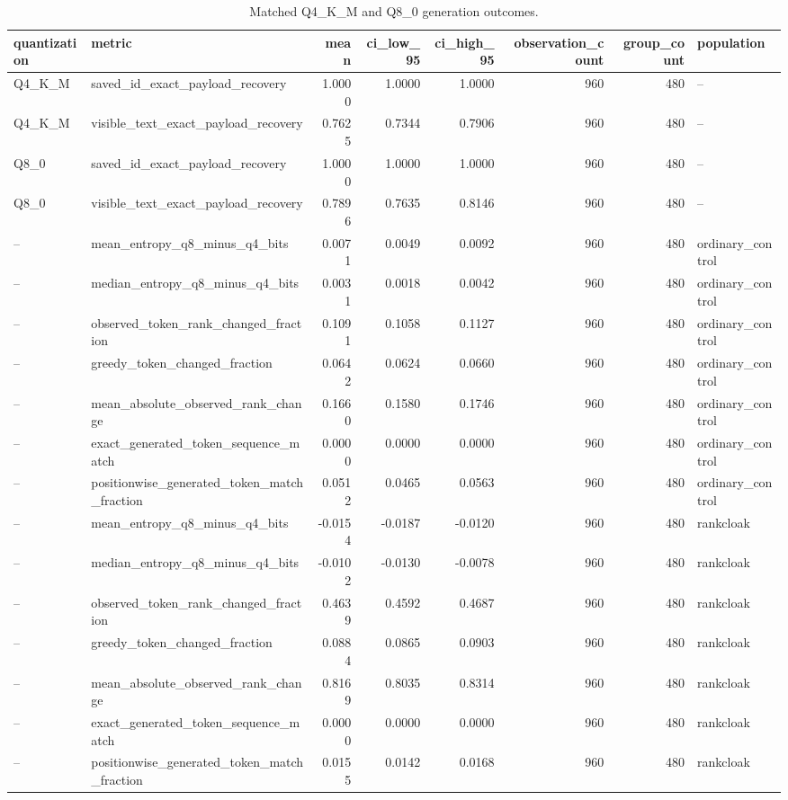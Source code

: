 \begin{table}
\caption{Matched Q4_K_M and Q8_0 generation outcomes.}
\label{tab:matched-quantization-generation}
\begin{tabular}{llrrrrrl}
\toprule
quantization & metric & mean & ci\_low\_95 & ci\_high\_95 & observation\_count & group\_count & population \\
\midrule
Q4\_K\_M & saved\_id\_exact\_payload\_recovery & 1.0000 & 1.0000 & 1.0000 & 960 & 480 & -- \\
Q4\_K\_M & visible\_text\_exact\_payload\_recovery & 0.7625 & 0.7344 & 0.7906 & 960 & 480 & -- \\
Q8\_0 & saved\_id\_exact\_payload\_recovery & 1.0000 & 1.0000 & 1.0000 & 960 & 480 & -- \\
Q8\_0 & visible\_text\_exact\_payload\_recovery & 0.7896 & 0.7635 & 0.8146 & 960 & 480 & -- \\
-- & mean\_entropy\_q8\_minus\_q4\_bits & 0.0071 & 0.0049 & 0.0092 & 960 & 480 & ordinary\_control \\
-- & median\_entropy\_q8\_minus\_q4\_bits & 0.0031 & 0.0018 & 0.0042 & 960 & 480 & ordinary\_control \\
-- & observed\_token\_rank\_changed\_fraction & 0.1091 & 0.1058 & 0.1127 & 960 & 480 & ordinary\_control \\
-- & greedy\_token\_changed\_fraction & 0.0642 & 0.0624 & 0.0660 & 960 & 480 & ordinary\_control \\
-- & mean\_absolute\_observed\_rank\_change & 0.1660 & 0.1580 & 0.1746 & 960 & 480 & ordinary\_control \\
-- & exact\_generated\_token\_sequence\_match & 0.0000 & 0.0000 & 0.0000 & 960 & 480 & ordinary\_control \\
-- & positionwise\_generated\_token\_match\_fraction & 0.0512 & 0.0465 & 0.0563 & 960 & 480 & ordinary\_control \\
-- & mean\_entropy\_q8\_minus\_q4\_bits & -0.0154 & -0.0187 & -0.0120 & 960 & 480 & rankcloak \\
-- & median\_entropy\_q8\_minus\_q4\_bits & -0.0102 & -0.0130 & -0.0078 & 960 & 480 & rankcloak \\
-- & observed\_token\_rank\_changed\_fraction & 0.4639 & 0.4592 & 0.4687 & 960 & 480 & rankcloak \\
-- & greedy\_token\_changed\_fraction & 0.0884 & 0.0865 & 0.0903 & 960 & 480 & rankcloak \\
-- & mean\_absolute\_observed\_rank\_change & 0.8169 & 0.8035 & 0.8314 & 960 & 480 & rankcloak \\
-- & exact\_generated\_token\_sequence\_match & 0.0000 & 0.0000 & 0.0000 & 960 & 480 & rankcloak \\
-- & positionwise\_generated\_token\_match\_fraction & 0.0155 & 0.0142 & 0.0168 & 960 & 480 & rankcloak \\
\bottomrule
\end{tabular}
\end{table}
